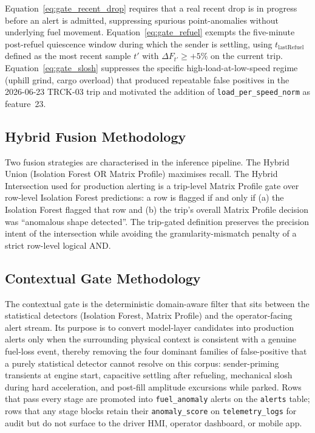 \vspace{0.5em}
Equation~\ref{eq:gate_recent_drop} requires that a real recent drop is in progress before an alert is admitted, suppressing spurious point-anomalies without underlying fuel movement. Equation~\ref{eq:gate_refuel} exempts the five-minute post-refuel quiescence window during which the sender is settling, using $t_{\mathrm{lastRefuel}}$ defined as the most recent sample $t'$ with $\Delta F_{t'} \geq +5\%$ on the current trip. Equation~\ref{eq:gate_slosh} suppresses the specific high-load-at-low-speed regime (uphill grind, cargo overload) that produced repeatable false positives in the 2026-06-23 TRCK-03 trip and motivated the addition of \texttt{load\_per\_speed\_norm} as feature~23.

\subsection{Hybrid Fusion Methodology}
Two fusion strategies are characterised in the inference pipeline. The Hybrid Union (Isolation Forest OR Matrix Profile) maximises recall. The Hybrid Intersection used for production alerting is a trip-level Matrix Profile gate over row-level Isolation Forest predictions: a row is flagged if and only if (a) the Isolation Forest flagged that row and (b) the trip's overall Matrix Profile decision was ``anomalous shape detected''. The trip-gated definition preserves the precision intent of the intersection while avoiding the granularity-mismatch penalty of a strict row-level logical AND.

\subsection{Contextual Gate Methodology}
\label{sec:contextual_gate_methodology}

The contextual gate is the deterministic domain-aware filter that sits between the statistical detectors (Isolation Forest, Matrix Profile) and the operator-facing alert stream. Its purpose is to convert model-layer candidates into production alerts only when the surrounding physical context is consistent with a genuine fuel-loss event, thereby removing the four dominant families of false-positive that a purely statistical detector cannot resolve on this corpus: sender-priming transients at engine start, capacitive settling after refueling, mechanical slosh during hard acceleration, and post-fill amplitude excursions while parked. Rows that pass every stage are promoted into \texttt{fuel\_anomaly} alerts on the \texttt{alerts} table; rows that any stage blocks retain their \texttt{anomaly\_score} on \texttt{telemetry\_logs} for audit but do not surface to the driver HMI, operator dashboard, or mobile app.


